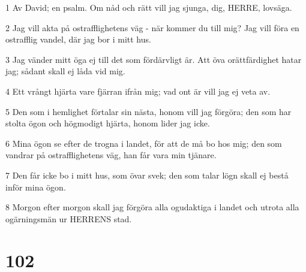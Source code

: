 \par 1 Av David; en psalm. Om nåd och rätt vill jag sjunga, dig, HERRE, lovsäga.
\par 2 Jag vill akta på ostrafflighetens väg - när kommer du till mig? Jag vill föra en ostrafflig vandel, där jag bor i mitt hus.
\par 3 Jag vänder mitt öga ej till det som fördärvligt är. Att öva orättfärdighet hatar jag; sådant skall ej låda vid mig.
\par 4 Ett vrångt hjärta vare fjärran ifrån mig; vad ont är vill jag ej veta av.
\par 5 Den som i hemlighet förtalar sin nästa, honom vill jag förgöra; den som har stolta ögon och högmodigt hjärta, honom lider jag icke.
\par 6 Mina ögon se efter de trogna i landet, för att de må bo hos mig; den som vandrar på ostrafflighetens väg, han får vara min tjänare.
\par 7 Den får icke bo i mitt hus, som övar svek; den som talar lögn skall ej bestå inför mina ögon.
\par 8 Morgon efter morgon skall jag förgöra alla ogudaktiga i landet och utrota alla ogärningsmän ur HERRENS stad.

\chapter{102}

